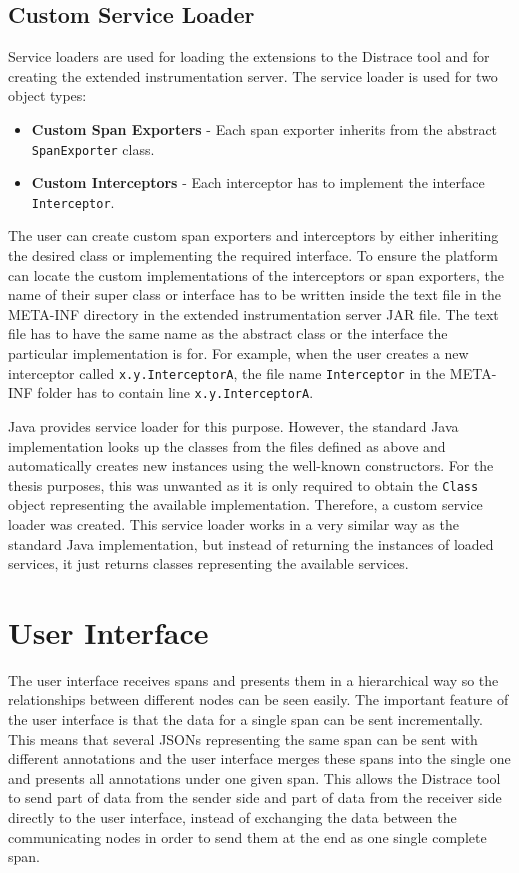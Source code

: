 \subsection{Custom Service Loader}
Service loaders are used for loading the extensions to the Distrace tool and for creating the extended instrumentation server. The service loader is used for two object types: 
\begin{itemize}
	\item \textbf{Custom Span Exporters} - Each span exporter inherits from the abstract \texttt{SpanExporter} class.
	\item \textbf{Custom Interceptors} - Each interceptor has to implement the interface \texttt{Interceptor}.
\end{itemize} 
The user can create custom span exporters and interceptors by either inheriting the desired class or implementing the required interface. To ensure the platform can locate the custom implementations of the interceptors or span exporters, the name of their super class or interface has to be written inside the text file in the META-INF directory in the extended instrumentation server JAR file. The text file has to have the same name as the abstract class or the interface the particular implementation is for. For example, when the user creates a new interceptor called \texttt{x.y.InterceptorA}, the file name \texttt{Interceptor} in the META-INF folder has to contain line \texttt{x.y.InterceptorA}.

Java provides service loader for this purpose. However, the standard Java implementation looks up the classes from the files defined as above and automatically creates new instances using the well-known constructors. For the thesis purposes, this was unwanted as it is only required to obtain the \texttt{Class} object representing the available implementation. Therefore, a custom service loader was created. This service loader works in a very similar way as the standard Java implementation, but instead of returning the instances of loaded services, it just returns classes representing the available services. 

\section{User Interface}
\label{sec:zipkin_ui}
The user interface receives spans and presents them in a hierarchical way so the relationships between different nodes can be seen easily. The important feature of the user interface is that the data for a single span can be sent incrementally. This means that several JSONs representing the same span can be sent with different annotations and the user interface merges these spans into the single one and presents all annotations under one given span. This allows the Distrace tool to send part of data from the sender side and part of data from the receiver side directly to the user interface, instead of exchanging the data between the communicating nodes in order to send them at the end as one single complete span.

